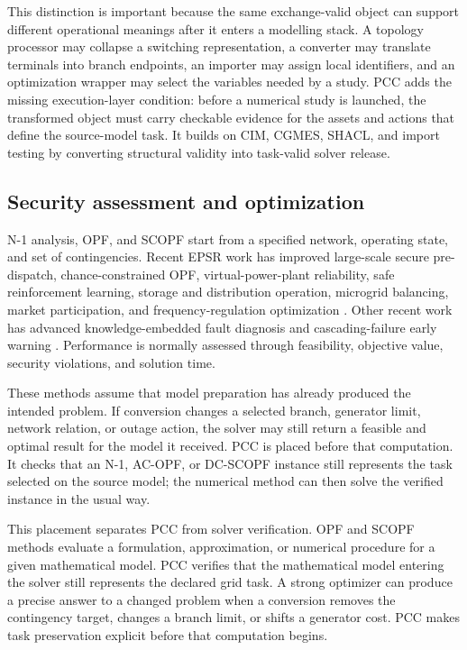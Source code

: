 \documentclass[preprint,12pt]{elsarticle}
\begin{document}
This distinction is important because the same exchange-valid object can support different operational meanings after it enters a modelling stack. A topology processor may collapse a switching representation, a converter may translate terminals into branch endpoints, an importer may assign local identifiers, and an optimization wrapper may select the variables needed by a study. PCC adds the missing execution-layer condition: before a numerical study is launched, the transformed object must carry checkable evidence for the assets and actions that define the source-model task. It builds on CIM, CGMES, SHACL, and import testing by converting structural validity into task-valid solver release.

\subsection{Security assessment and optimization}

N-1 analysis, OPF, and SCOPF start from a specified network, operating state, and set of contingencies. Recent EPSR work has improved large-scale secure pre-dispatch, chance-constrained OPF, virtual-power-plant reliability, safe reinforcement learning, storage and distribution operation, microgrid balancing, market participation, and frequency-regulation optimization \citep{epsr2026_01,epsr2026_02,epsr2026_03,epsr2026_05,epsr2026_06,epsr2026_07,epsr2026_08,epsr2026_09,epsr2026_10,epsr2026_11}. Other recent work has advanced knowledge-embedded fault diagnosis and cascading-failure early warning \citep{epsr2026_04}. Performance is normally assessed through feasibility, objective value, security violations, and solution time.

These methods assume that model preparation has already produced the intended problem. If conversion changes a selected branch, generator limit, network relation, or outage action, the solver may still return a feasible and optimal result for the model it received. PCC is placed before that computation. It checks that an N-1, AC-OPF, or DC-SCOPF instance still represents the task selected on the source model; the numerical method can then solve the verified instance in the usual way.

This placement separates PCC from solver verification. OPF and SCOPF methods evaluate a formulation, approximation, or numerical procedure for a given mathematical model. PCC verifies that the mathematical model entering the solver still represents the declared grid task. A strong optimizer can produce a precise answer to a changed problem when a conversion removes the contingency target, changes a branch limit, or shifts a generator cost. PCC makes task preservation explicit before that computation begins.
\end{document}
